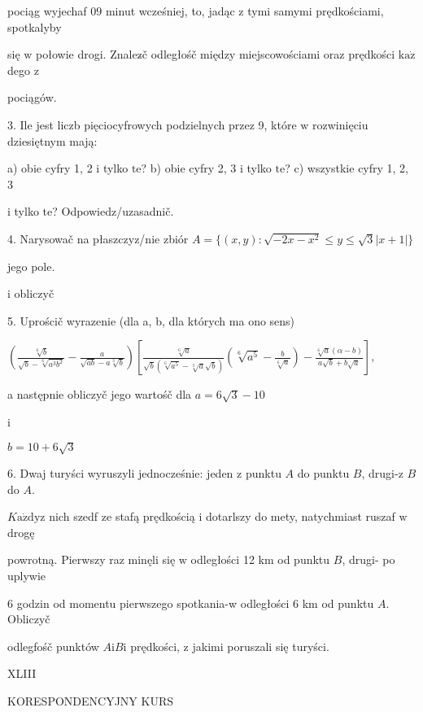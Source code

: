 \documentclass[a4paper,12pt]{article}
\begin{document}
pociąg wyjechaf $09$ minut wcześniej, to, jadąc $\mathrm{z}$ tymi samymi prędkościami, spotkalyby

się $\mathrm{w}$ połowie drogi. Znalez$\acute{}$č odległośč między miejscowościami oraz prędkości $\mathrm{k}\mathrm{a}\dot{\mathrm{z}}$ dego $\mathrm{z}$

pociągów.

3. Ile jest liczb pięciocyfrowych podzielnych przez 9, które $\mathrm{w}$ rozwinięciu dziesiętnym mają:

a) obie cyfry 1, 2 $\mathrm{i}$ tylko $\mathrm{t}\mathrm{e}$? b) obie cyfry 2, 3 $\mathrm{i}$ tylko $\mathrm{t}\mathrm{e}$? c) wszystkie cyfry 1, 2, 3

$\mathrm{i}$ tylko $\mathrm{t}\mathrm{e}$? Odpowiedz/uzasadnič.

4. Narysowač na płaszczyz/nie zbiór $A=\{(x,y):\sqrt{-2x-x^{2}}\leq y\leq\sqrt{3}|x+1|\}$

jego pole.

i obliczyč

5. Uprościč wyrazenie (dla a, b, dla których ma ono sens)

$(\displaystyle \frac{\sqrt[6]{b}}{\sqrt{b}-\sqrt[6]{a^{3}b^{2}}}-\frac{a}{\sqrt{ab}-a\sqrt[3]{b}})[\frac{\sqrt[6]{a}}{\sqrt{b}(\sqrt[6]{a^{5}}-\sqrt[3]{a}\sqrt{b})}(\sqrt[6]{a^{5}}-\frac{b}{\sqrt[6]{a}})-\frac{\sqrt[6]{a}(\alpha-b)}{a\sqrt{b}+b\sqrt{a}}],$

a następnie obliczyč jego wartośč dla $a=6\sqrt{3}-10$

i

$b=10+6\sqrt{3}$

6. Dwaj turyści wyruszyli jednocześnie: jeden $\mathrm{z}$ punktu $A$ do punktu $B$, drugi-z $B$ do $A.$

$K\mathrm{a}\dot{\mathrm{z}}\mathrm{d}\mathrm{y}\mathrm{z}$ nich szedf ze stafą prędkością $\mathrm{i}$ dotarlszy do mety, natychmiast ruszaf $\mathrm{w}$ drogę

powrotną. Pierwszy raz minęli się $\mathrm{w}$ odległości 12 km od punktu $B$, drugi- po uplywie

6 godzin od momentu pierwszego spotkania-w odległości 6 km od punktu $A$. Obliczyč

odlegfośč punktów $A\mathrm{i}B\mathrm{i}$ prędkości, $\mathrm{z}$ jakimi poruszali się turyści.





XLIII

KORESPONDENCYJNY KURS
\end{document}
